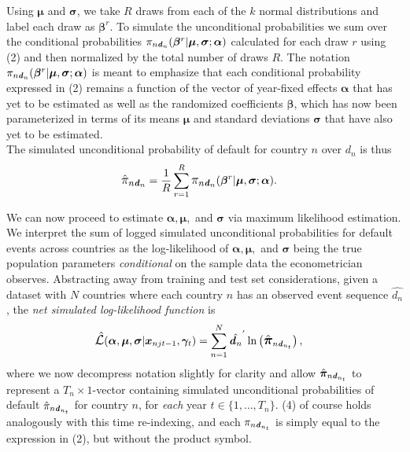 \documentclass[12pt]{article}
\begin{document}
Using $\boldsymbol{\mu}$ and $\boldsymbol{\sigma}$, we take $R$ draws from each of the $k$ normal distributions and label each draw as $\boldsymbol{\beta}^{r}$. To simulate the unconditional probabilities we sum over the conditional probabilities $\mathlarger{\pi}_{n\boldsymbol{\mathit{d}}_n}(\boldsymbol{\beta}^{r}|\boldsymbol{\mu}, \boldsymbol{\sigma};\boldsymbol{\alpha})$ calculated for each draw $r$ using (2) and then normalized by the total number of draws $R$. The notation $\mathlarger{\pi}_{n\boldsymbol{\mathit{d}}_n}(\boldsymbol{\beta}^{r}|\boldsymbol{\mu}, \boldsymbol{\sigma}; \boldsymbol{\alpha})$ is meant to emphasize that each conditional probability expressed in (2) remains a function of the vector of year-fixed effects $\boldsymbol{\alpha}$ that has yet to be estimated as well as the randomized coefficients $\boldsymbol{\beta}$, which has now been parameterized in terms of its means $\boldsymbol{\mu}$ and standard deviations $\boldsymbol{\sigma}$ that have also yet to be estimated. \\

The simulated unconditional probability of default for country $n$ over $\boldsymbol{\mathit{d}}_n$ is thus
\begin{align}
\mathlarger{\hat{{\pi}}_{n\boldsymbol{\mathit{d}}_n}} &= 
\frac{1}{R} \sum\limits_{r=1}^{R} \mathlarger{\pi_{n\boldsymbol{\mathit{d}}_n}}(\boldsymbol{\beta}^{r}|\boldsymbol{\mu}, \boldsymbol{\sigma};\boldsymbol{\alpha}).
\end{align}

We can now proceed to estimate $\boldsymbol{\alpha}, \boldsymbol{\mu},$ and $\boldsymbol{\sigma}$ via maximum likelihood estimation. We interpret the sum of logged simulated unconditional probabilities for default events across countries as the log-likelihood of $\boldsymbol{\alpha}, \boldsymbol{\mu},$ and $\boldsymbol{\sigma}$ being the true population parameters \textit{conditional} on the sample data the econometrician observes. Abstracting away from training and test set considerations, given a dataset with $N$ countries where each country $n$ has an observed event sequence $\hat{\boldsymbol{\mathit{d}}_n}$, the \textit{net simulated log-likelihood function} is
\begin{align}
\mathlarger{\hat{\mathcal{L}}}(\boldsymbol{\alpha}, \boldsymbol{\mu}, \boldsymbol{\sigma}|\boldsymbol{x}_{njt-1}, \boldsymbol{\gamma}_t) &= \sum\limits_{n=1}^{N} \hat{\boldsymbol{\mathit{d}}_n}^{'} \ln\left(\mathlarger{\hat{\boldsymbol{\pi}}}_{n\boldsymbol{\mathit{d}}_{n_{t}}}\right),
\end{align}
where we now decompress notation slightly for clarity and allow $\mathlarger{\hat{\boldsymbol{\pi}}}_{n\boldsymbol{\mathit{d}}_{n_{t}}}$ to represent a $T_n \times 1$-vector containing simulated unconditional probabilities of default $\mathlarger{\hat{\pi}}_{n\boldsymbol{\mathit{d}}_{n_{t}}}$ for country $n$, for \textit{each} year $t \in \{1, \dots, T_n\}$. (4) of course holds analogously with this time re-indexing, and each $\mathlarger{\pi}_{n\boldsymbol{\mathit{d}}_{n_{t}}}$ is simply equal to the expression in (2), but without the product symbol.\\
\end{document}
